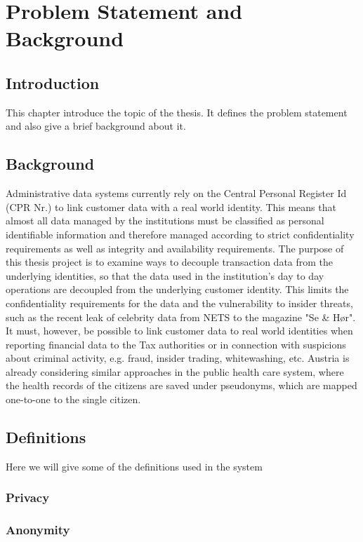 \chapter{Problem Statement and Background}

\section{Introduction}
This chapter introduce the topic of the thesis. It defines the problem statement and also give a brief background about it.

\section{Background}
Administrative data systems currently rely on the Central Personal Register Id (CPR Nr.) to link customer data with a real world identity. This means that almost all data managed by the institutions must be classified as personal identifiable information and therefore managed according to strict confidentiality requirements as well as integrity and availability requirements. The purpose of this thesis project is to examine ways to decouple transaction data from the underlying identities, so that the data used in the institution's day to day operations are decoupled from the underlying customer identity. This limits the confidentiality requirements for the data and the vulnerability to insider threats, such as the recent leak of celebrity data from NETS to the magazine "Se \& Hør". It must, however, be possible to link customer data to real world identities when reporting financial data to the Tax authorities or in connection with suspicions about criminal activity, e.g. fraud, insider trading, whitewashing, etc. Austria is already considering similar approaches in the public health care system, where the health records of the citizens are saved under pseudonyms, which are mapped one-to-one to the single citizen.
\section{Definitions}
Here we will give some of the definitions used in the system
\subsection{Privacy}
\subsection{Anonymity}
